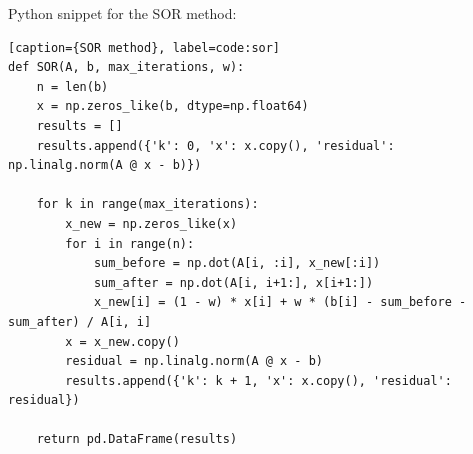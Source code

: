\documentclass[10pt]{article}
\begin{document}
Python snippet for the SOR method:
\begin{lstlisting}[style=custompython][caption={SOR method}, label=code:sor]
def SOR(A, b, max_iterations, w):
    n = len(b)
    x = np.zeros_like(b, dtype=np.float64)
    results = []
    results.append({'k': 0, 'x': x.copy(), 'residual': np.linalg.norm(A @ x - b)})
    
    for k in range(max_iterations):
        x_new = np.zeros_like(x)
        for i in range(n):
            sum_before = np.dot(A[i, :i], x_new[:i])
            sum_after = np.dot(A[i, i+1:], x[i+1:])
            x_new[i] = (1 - w) * x[i] + w * (b[i] - sum_before - sum_after) / A[i, i]
        x = x_new.copy()
        residual = np.linalg.norm(A @ x - b)
        results.append({'k': k + 1, 'x': x.copy(), 'residual': residual})
    
    return pd.DataFrame(results)
\end{lstlisting}
\end{document}
